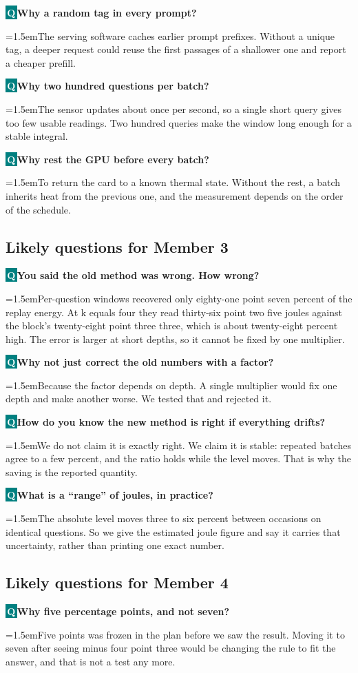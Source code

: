 \documentclass[11pt,a4paper]{article}
\newcommand{\qa}[2]{%
  \needspace{4\baselineskip}%
  \par\addvspace{7pt}%
  {\noindent\colorbox{teal}{\textcolor{white}{\bfseries\,Q\,}}\;\textbf{#1}\par}%
  \addvspace{2pt}%
  {\leftskip=1.5em\relax\color{ink}#2\par}%
  \addvspace{2pt}}
\begin{document}
\qa{Why a random tag in every prompt?}{The serving software caches earlier prompt prefixes. Without a unique tag, a deeper request could reuse the first passages of a shallower one and report a cheaper prefill.}

\qa{Why two hundred questions per batch?}{The sensor updates about once per second, so a single short query gives too few usable readings. Two hundred queries make the window long enough for a stable integral.}

\qa{Why rest the GPU before every batch?}{To return the card to a known thermal state. Without the rest, a batch inherits heat from the previous one, and the measurement depends on the order of the schedule.}

\subsection*{Likely questions for Member 3}

\qa{You said the old method was wrong. How wrong?}{Per-question windows recovered only eighty-one point seven percent of the replay energy. At k equals four they read thirty-six point two five joules against the block's twenty-eight point three three, which is about twenty-eight percent high. The error is larger at short depths, so it cannot be fixed by one multiplier.}

\qa{Why not just correct the old numbers with a factor?}{Because the factor depends on depth. A single multiplier would fix one depth and make another worse. We tested that and rejected it.}

\qa{How do you know the new method is right if everything drifts?}{We do not claim it is exactly right. We claim it is stable: repeated batches agree to a few percent, and the ratio holds while the level moves. That is why the saving is the reported quantity.}

\qa{What is a ``range'' of joules, in practice?}{The absolute level moves three to six percent between occasions on identical questions. So we give the estimated joule figure and say it carries that uncertainty, rather than printing one exact number.}

\subsection*{Likely questions for Member 4}

\qa{Why five percentage points, and not seven?}{Five points was frozen in the plan before we saw the result. Moving it to seven after seeing minus four point three would be changing the rule to fit the answer, and that is not a test any more.}
\end{document}
